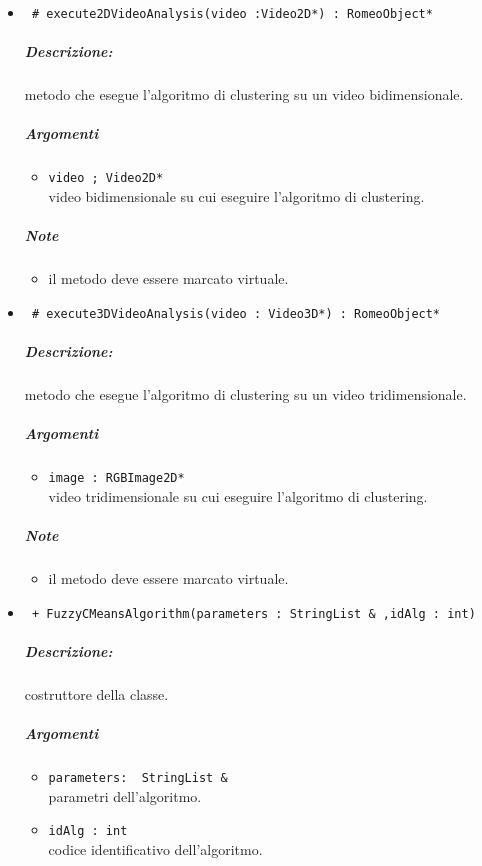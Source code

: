 \begin{itemize}
		\item \color{blue}\verb! # execute2DVideoAnalysis(video :Video2D*) : RomeoObject* !\\
			\color{black}
			\subparagraph{Descrizione:} metodo che esegue l'algoritmo di clustering su un video bidimensionale.
			\subparagraph{Argomenti}
				\begin{itemize}
					\item \color{RoyalPurple}\verb!video ; Video2D* !\\
					\color{black} video bidimensionale su cui eseguire l'algoritmo di clustering.
				\end{itemize}
				\subparagraph{Note}
				\begin{itemize}
					\item il metodo deve essere marcato virtuale.
				\end{itemize}
		\item \color{blue}\verb! # execute3DVideoAnalysis(video : Video3D*) : RomeoObject* !\\
			\color{black}
			\subparagraph{Descrizione:} metodo che esegue l'algoritmo di clustering su un video tridimensionale.
			\subparagraph{Argomenti}
				\begin{itemize}
					\item \color{RoyalPurple}\verb!image : RGBImage2D*!\\
					\color{black} video tridimensionale su cui eseguire l'algoritmo di clustering.
				\end{itemize}
				\subparagraph{Note}
			\begin{itemize}
				\item il metodo deve essere marcato virtuale.
			\end{itemize}
			
		\item \color{blue}\verb! + FuzzyCMeansAlgorithm(parameters : StringList & ,idAlg : int)!\\
			\color{black}
			\subparagraph{Descrizione:} costruttore della classe.
			\subparagraph{Argomenti}
				\begin{itemize}
					\item \color{RoyalPurple}\verb!parameters:  StringList &  !\\
					\color{black} parametri dell'algoritmo.
					\item \color{RoyalPurple}\verb!idAlg : int!\\
					\color{black} codice identificativo dell'algoritmo.
				\end{itemize}
			

\end{itemize}
